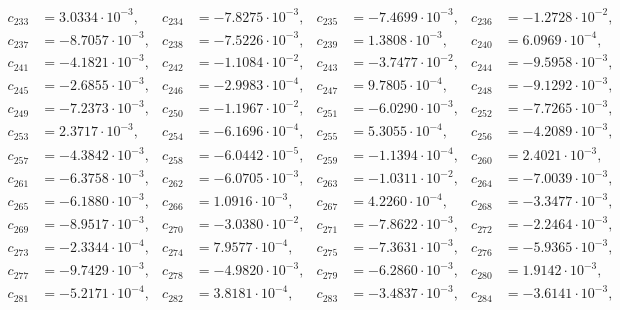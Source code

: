 \begin{align*}
c_{ 233 } &= 3.0334 \cdot 10^{ -3 }, & c_{ 234 } &= -7.8275 \cdot 10^{ -3 }, & c_{ 235 } &= -7.4699 \cdot 10^{ -3 }, & c_{ 236 } &= -1.2728 \cdot 10^{ -2 },\\ 
c_{ 237 } &= -8.7057 \cdot 10^{ -3 }, & c_{ 238 } &= -7.5226 \cdot 10^{ -3 }, & c_{ 239 } &= 1.3808 \cdot 10^{ -3 }, & c_{ 240 } &= 6.0969 \cdot 10^{ -4 },\\ 
c_{ 241 } &= -4.1821 \cdot 10^{ -3 }, & c_{ 242 } &= -1.1084 \cdot 10^{ -2 }, & c_{ 243 } &= -3.7477 \cdot 10^{ -2 }, & c_{ 244 } &= -9.5958 \cdot 10^{ -3 },\\ 
c_{ 245 } &= -2.6855 \cdot 10^{ -3 }, & c_{ 246 } &= -2.9983 \cdot 10^{ -4 }, & c_{ 247 } &= 9.7805 \cdot 10^{ -4 }, & c_{ 248 } &= -9.1292 \cdot 10^{ -3 },\\ 
c_{ 249 } &= -7.2373 \cdot 10^{ -3 }, & c_{ 250 } &= -1.1967 \cdot 10^{ -2 }, & c_{ 251 } &= -6.0290 \cdot 10^{ -3 }, & c_{ 252 } &= -7.7265 \cdot 10^{ -3 },\\ 
c_{ 253 } &= 2.3717 \cdot 10^{ -3 }, & c_{ 254 } &= -6.1696 \cdot 10^{ -4 }, & c_{ 255 } &= 5.3055 \cdot 10^{ -4 }, & c_{ 256 } &= -4.2089 \cdot 10^{ -3 },\\ 
c_{ 257 } &= -4.3842 \cdot 10^{ -3 }, & c_{ 258 } &= -6.0442 \cdot 10^{ -5 }, & c_{ 259 } &= -1.1394 \cdot 10^{ -4 }, & c_{ 260 } &= 2.4021 \cdot 10^{ -3 },\\ 
c_{ 261 } &= -6.3758 \cdot 10^{ -3 }, & c_{ 262 } &= -6.0705 \cdot 10^{ -3 }, & c_{ 263 } &= -1.0311 \cdot 10^{ -2 }, & c_{ 264 } &= -7.0039 \cdot 10^{ -3 },\\ 
c_{ 265 } &= -6.1880 \cdot 10^{ -3 }, & c_{ 266 } &= 1.0916 \cdot 10^{ -3 }, & c_{ 267 } &= 4.2260 \cdot 10^{ -4 }, & c_{ 268 } &= -3.3477 \cdot 10^{ -3 },\\ 
c_{ 269 } &= -8.9517 \cdot 10^{ -3 }, & c_{ 270 } &= -3.0380 \cdot 10^{ -2 }, & c_{ 271 } &= -7.8622 \cdot 10^{ -3 }, & c_{ 272 } &= -2.2464 \cdot 10^{ -3 },\\ 
c_{ 273 } &= -2.3344 \cdot 10^{ -4 }, & c_{ 274 } &= 7.9577 \cdot 10^{ -4 }, & c_{ 275 } &= -7.3631 \cdot 10^{ -3 }, & c_{ 276 } &= -5.9365 \cdot 10^{ -3 },\\ 
c_{ 277 } &= -9.7429 \cdot 10^{ -3 }, & c_{ 278 } &= -4.9820 \cdot 10^{ -3 }, & c_{ 279 } &= -6.2860 \cdot 10^{ -3 }, & c_{ 280 } &= 1.9142 \cdot 10^{ -3 },\\ 
c_{ 281 } &= -5.2171 \cdot 10^{ -4 }, & c_{ 282 } &= 3.8181 \cdot 10^{ -4 }, & c_{ 283 } &= -3.4837 \cdot 10^{ -3 }, & c_{ 284 } &= -3.6141 \cdot 10^{ -3 },\\ 

\end{align*}

